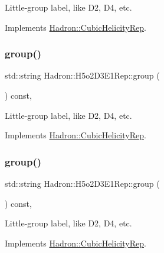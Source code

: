 Little-\/group label, like D2, D4, etc. 

Implements \mbox{\hyperlink{structHadron_1_1CubicHelicityRep_a101a7d76cd8ccdad0f272db44b766113}{Hadron\+::\+Cubic\+Helicity\+Rep}}.

\mbox{\label{structHadron_1_1H5o2D3E1Rep_a80104355e2d046afbfe385b15b96b79a}} 
\subsubsection{\texorpdfstring{group()}{group()}\hspace{0.1cm}{\footnotesize\ttfamily [2/3]}}
{\footnotesize\ttfamily std\+::string Hadron\+::\+H5o2\+D3\+E1\+Rep\+::group (\begin{DoxyParamCaption}{ }\end{DoxyParamCaption}) const\hspace{0.3cm}{\ttfamily [inline]}, {\ttfamily [virtual]}}

Little-\/group label, like D2, D4, etc. 

Implements \mbox{\hyperlink{structHadron_1_1CubicHelicityRep_a101a7d76cd8ccdad0f272db44b766113}{Hadron\+::\+Cubic\+Helicity\+Rep}}.

\mbox{\label{structHadron_1_1H5o2D3E1Rep_a80104355e2d046afbfe385b15b96b79a}} 
\subsubsection{\texorpdfstring{group()}{group()}\hspace{0.1cm}{\footnotesize\ttfamily [3/3]}}
{\footnotesize\ttfamily std\+::string Hadron\+::\+H5o2\+D3\+E1\+Rep\+::group (\begin{DoxyParamCaption}{ }\end{DoxyParamCaption}) const\hspace{0.3cm}{\ttfamily [inline]}, {\ttfamily [virtual]}}

Little-\/group label, like D2, D4, etc. 

Implements \mbox{\hyperlink{structHadron_1_1CubicHelicityRep_a101a7d76cd8ccdad0f272db44b766113}{Hadron\+::\+Cubic\+Helicity\+Rep}}.

